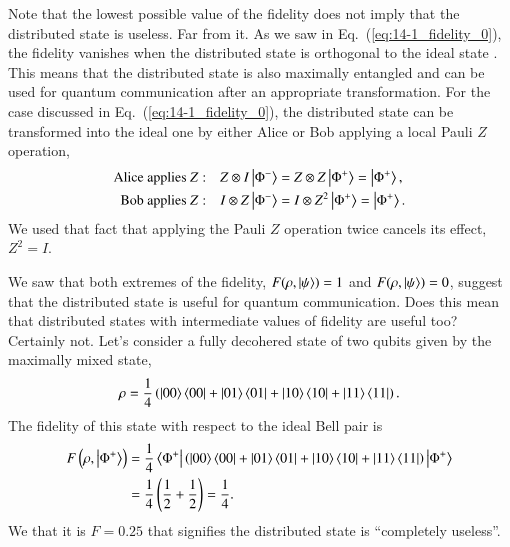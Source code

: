 Note that the lowest possible value of the fidelity does not imply that the distributed state is useless.
Far from it.
As we saw in Eq.~(\ref{eq:14-1_fidelity_0}), the fidelity vanishes when the distributed state is orthogonal to the ideal state \ket{\Phi^+}.
This means that the distributed state is also maximally entangled and can be used for quantum communication after an appropriate transformation.
For the case discussed in Eq.~(\ref{eq:14-1_fidelity_0}), the distributed state can be transformed into the ideal one by either Alice or Bob applying a local Pauli $Z$ operation,
\begin{align}
    \text{Alice applies } Z: \quad & Z \otimes I \ket{\Phi^-} = Z \otimes Z \ket{\Phi^+} = \ket{\Phi^+}, \\
    \text{Bob applies } Z: \quad & I \otimes Z \ket{\Phi^-} = I \otimes Z^2 \ket{\Phi^+} = \ket{\Phi^+}.
\end{align}
We used that fact that applying the Pauli $Z$ operation twice cancels its effect, $Z^2 = I$.

We saw that both extremes of the fidelity, $F(\rho,\left| \psi \right\rangle) = 1$ and $F(\rho,\left| \psi \right\rangle) = 0$, suggest that the distributed state is useful for quantum communication.
Does this mean that distributed states with intermediate values of fidelity are useful too?
Certainly not.
Let's consider a fully decohered state of two qubits given by the maximally mixed state,
\begin{equation}
    \rho = \frac{1}{4} \left( \left| 00 \right\rangle\left\langle 00 \right| + \left| 01 \right\rangle\left\langle 01 \right| + \left| 10 \right\rangle\left\langle 10 \right| + \left| 11 \right\rangle\left\langle 11 \right| \right).
\end{equation}
The fidelity of this state with respect to the ideal Bell pair \ket{\Phi^+} is
\begin{align}
    F \left( \rho, \left| \Phi^+ \right\rangle \right) & = \frac{1}{4} \left\langle \Phi^+ \right| \left( \left| 00 \right\rangle\left\langle 00 \right| + \left| 01 \right\rangle\left\langle 01 \right| + \left| 10 \right\rangle\left\langle 10 \right| + \left| 11 \right\rangle\left\langle 11 \right| \right) \left| \Phi^+ \right\rangle \nonumber\\
    & = \frac{1}{4} \left( \frac{1}{2} + \frac{1}{2} \right) = \frac{1}{4}.
\end{align}
We that it is $F=0.25$ that signifies the distributed state is ``completely useless''.

